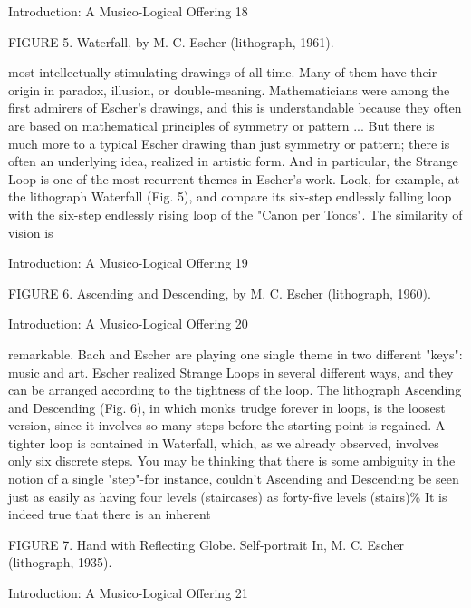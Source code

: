 Introduction: A Musico-Logical Offering                                                     18

                FIGURE 5. Waterfall, by M. C. Escher (lithograph, 1961).

most intellectually stimulating drawings of all time. Many of them have their origin in
paradox, illusion, or double-meaning. Mathematicians were among the first admirers of
Escher's drawings, and this is understandable because they often are based on
mathematical principles of symmetry or pattern ... But there is much more to a typical
Escher drawing than just symmetry or pattern; there is often an underlying idea, realized
in artistic form. And in particular, the Strange Loop is one of the most recurrent themes in
Escher's work. Look, for example, at the lithograph Waterfall (Fig. 5), and compare its
six-step endlessly falling loop with the six-step endlessly rising loop of the "Canon per
Tonos". The similarity of vision is




Introduction: A Musico-Logical Offering                                                  19

      FIGURE 6. Ascending and Descending, by M. C. Escher (lithograph, 1960).




Introduction: A Musico-Logical Offering                                         20

remarkable. Bach and Escher are playing one single theme in two different "keys": music
and art.
   Escher realized Strange Loops in several different ways, and they can be arranged
according to the tightness of the loop. The lithograph Ascending and Descending (Fig. 6),
in which monks trudge forever in loops, is the loosest version, since it involves so many
steps before the starting point is regained. A tighter loop is contained in Waterfall, which,
as we already observed, involves only six discrete steps. You may be thinking that there
is some ambiguity in the notion of a single "step"-for instance, couldn't Ascending and
Descending be seen just as easily as having four levels (staircases) as forty-five levels
(stairs)\% It is indeed true that there is an inherent




   FIGURE 7. Hand with Reflecting Globe. Self-portrait In, M. C. Escher (lithograph,
                                     1935).




Introduction: A Musico-Logical Offering                                                   21

